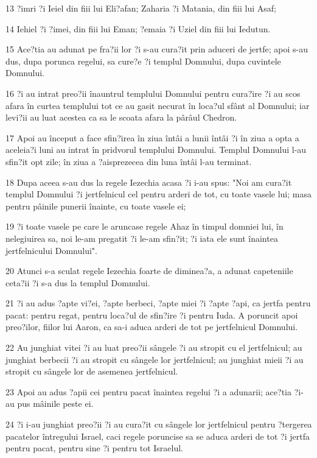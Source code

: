 \par 13 ?imri ?i Ieiel din fiii lui Eli?afan; Zaharia ?i Matania, din fiii lui Asaf;
\par 14 Iehiel ?i ?imei, din fiii lui Eman; ?emaia ?i Uziel din fiii lui Iedutun.
\par 15 Ace?tia au adunat pe fra?ii lor ?i s-au cura?it prin aduceri de jertfe; apoi s-au dus, dupa porunca regelui, sa cure?e ?i templul Domnului, dupa cuvintele Domnului.
\par 16 ?i au intrat preo?ii înauntrul templului Domnului pentru cura?ire ?i au scos afara în curtea templului tot ce au gasit necurat în loca?ul sfânt al Domnului; iar levi?ii au luat acestea ca sa le scoata afara la pârâul Chedron.
\par 17 Apoi au început a face sfin?irea în ziua întâi a lunii întâi ?i în ziua a opta a aceleia?i luni au intrat în pridvorul templului Domnului. Templul Domnului l-au sfin?it opt zile; în ziua a ?aisprezecea din luna întâi l-au terminat.
\par 18 Dupa aceea s-au dus la regele Iezechia acasa ?i i-au spus: "Noi am cura?it templul Domnului ?i jertfelnicul cel pentru arderi de tot, cu toate vasele lui; masa pentru pâinile punerii înainte, cu toate vasele ei;
\par 19 ?i toate vasele pe care le aruncase regele Ahaz în timpul domniei lui, în nelegiuirea sa, noi le-am pregatit ?i le-am sfin?it; ?i iata ele sunt înaintea jertfelnicului Domnului".
\par 20 Atunci s-a sculat regele Iezechia foarte de diminea?a, a adunat capeteniile ceta?ii ?i s-a dus la templul Domnului.
\par 21 ?i au adus ?apte vi?ei, ?apte berbeci, ?apte miei ?i ?apte ?api, ca jertfa pentru pacat: pentru regat, pentru loca?ul de sfin?ire ?i pentru Iuda. A poruncit apoi preo?ilor, fiilor lui Aaron, ca sa-i aduca arderi de tot pe jertfelnicul Domnului.
\par 22 Au junghiat vitei ?i au luat preo?ii sângele ?i au stropit cu el jertfelnicul; au junghiat berbecii ?i au stropit cu sângele lor jertfelnicul; au junghiat mieii ?i au stropit cu sângele lor de asemenea jertfelnicul.
\par 23 Apoi au adus ?apii cei pentru pacat înaintea regelui ?i a adunarii; ace?tia ?i-au pus mâinile peste ei.
\par 24 ?i i-au junghiat preo?ii ?i au cura?it cu sângele lor jertfelnicul pentru ?tergerea pacatelor întregului Israel, caci regele poruncise sa se aduca arderi de tot ?i jertfa pentru pacat, pentru sine ?i pentru tot Israelul.

